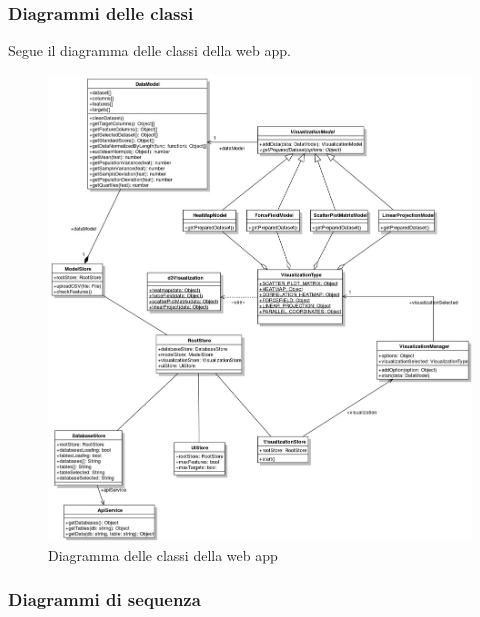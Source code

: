     \pagebreak
    
    \subsubsection{Diagrammi delle classi}
    Segue il diagramma delle classi della web app.
    \begin{figure}[H]
        \centering\includegraphics[width=1\textwidth]{source/img/classi.jpeg}
        \caption{Diagramma delle classi della web app}
    \end{figure}
    
    \pagebreak
    
    \subsubsection{Diagrammi di sequenza}
